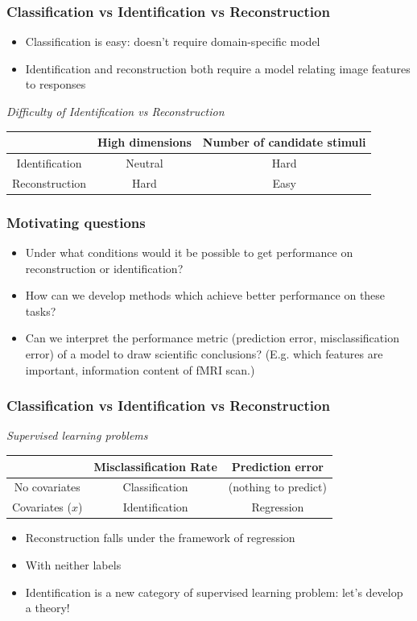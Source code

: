 \documentclass{beamer}
\begin{document}
\begin{frame}
\frametitle{Classification vs Identification vs Reconstruction}
\begin{itemize}
\item Classification is easy: doesn't require domain-specific model
\item Identification and reconstruction both require a model relating image features to responses
\end{itemize}
\begin{center}
\emph{Difficulty of Identification vs Reconstruction}
\begin{tabular}{|c|c|c|}
\hline
&  High dimensions & Number of candidate stimuli \\ \hline
Identification & Neutral & Hard \\ \hline
Reconstruction & Hard & Easy \\ \hline
\end{tabular}
\end{center}
\end{frame}

\begin{frame}
\frametitle{Motivating questions}
\begin{itemize}
\item
Under what conditions would it be possible to get performance on
reconstruction or identification?
\item
How can we develop methods which achieve better performance on these
tasks?
\item
Can we interpret the performance metric (prediction error,
misclassification error) of a model to draw scientific conclusions?
(E.g. which features are important, information content of fMRI scan.)
\end{itemize}
\end{frame}



\begin{frame}
\frametitle{Classification vs Identification vs Reconstruction}
\begin{center}
\emph{Supervised learning problems}
\begin{tabular}{|c|c|c|}
\hline
 & Misclassification Rate & Prediction error \\ \hline
No covariates & Classification & (nothing to predict) \\ \hline
Covariates ($x$) & Identification & Regression \\ \hline
\end{tabular}
\end{center}
\begin{itemize}
\item Reconstruction falls under the framework of regression
\item With neither labels 
\item Identification is a new category of supervised learning problem:
let's develop a theory!
\end{itemize}
\end{frame}
\end{document}
